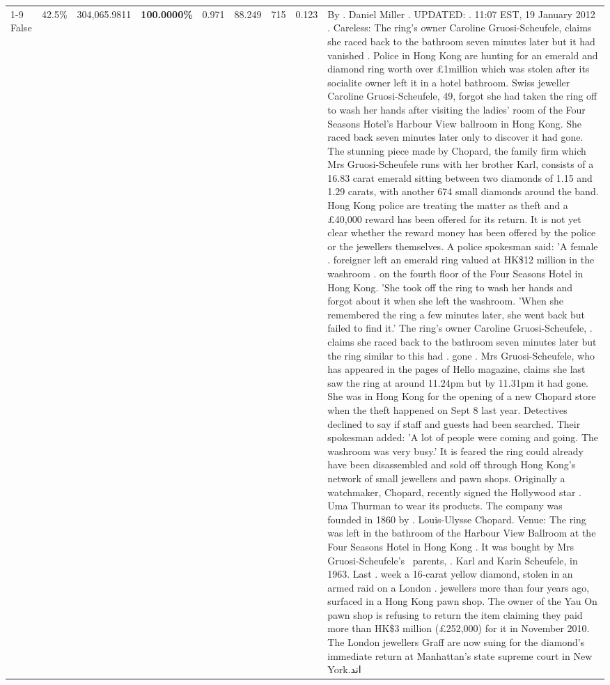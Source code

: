 \begin{table}[H]
\begin{tabular}{lllrlllll}
\cline{1-9} \cline{2-9}
False & 42.5\% & \color{red} 304,065.9811 & \bfseries \color{red} 100.0000\% & 0.971 & 88.249 & 715 & 0.123 & By . Daniel Miller . UPDATED: . 11:07 EST, 19 January 2012 . Careless: The ring's owner Caroline Gruosi-Scheufele, claims she raced back to the bathroom seven minutes later but it had vanished . Police in Hong Kong are hunting for an emerald and diamond ring worth over £1million which was stolen after its socialite owner left it in a hotel bathroom. Swiss jeweller Caroline Gruosi-Scheufele, 49, forgot she had taken the ring off to wash her hands after visiting the ladies' room of the Four Seasons Hotel's Harbour View ballroom in Hong Kong. She raced back seven minutes later only to discover it had gone. The stunning piece made by Chopard, the family firm which Mrs Gruosi-Scheufele runs with her brother Karl, consists of a 16.83 carat emerald sitting between two diamonds of 1.15 and 1.29 carats, with another 674 small diamonds around the band. Hong Kong police are treating the matter as theft and a £40,000 reward has been offered for its return. It is not yet clear whether the reward money has been offered by the police or the jewellers themselves. A police spokesman said: 'A female . foreigner left an emerald ring valued at HK\$12 million in the washroom . on the fourth floor of the Four Seasons Hotel in Hong Kong. 'She took off the ring to wash her hands and forgot about it when she left the washroom. 'When she remembered the ring a few minutes later, she went back but failed to find it.' The ring's owner Caroline Gruosi-Scheufele, . claims she raced back to the bathroom seven minutes later but the ring similar to this had . gone . Mrs Gruosi-Scheufele, who has appeared in the pages of Hello magazine, claims she last saw the ring at around 11.24pm but by 11.31pm it had gone. She was in Hong Kong for the opening of a new Chopard store when the theft happened on Sept 8 last year. Detectives declined to say if staff and guests had been searched. Their spokesman added: 'A lot of people were coming and going. The washroom was very busy.' It is feared the ring could already have been disassembled and sold off through Hong Kong's network of small jewellers and pawn shops. Originally a watchmaker, Chopard, recently signed the Hollywood star . Uma Thurman to wear its products. The company was founded in 1860 by . Louis-Ulysse Chopard. Venue: The ring was left in the bathroom of the Harbour View Ballroom at the Four Seasons Hotel in Hong Kong . It was bought by Mrs Gruosi-Scheufele's  parents, . Karl and Karin Scheufele, in 1963. Last . week a 16-carat yellow diamond, stolen in an armed raid on a London . jewellers more than four years ago, surfaced in a Hong Kong pawn shop. The owner of the Yau On pawn shop is refusing to return the item claiming they paid more than HK\$3 million (£252,000) for it in November 2010. The London jewellers Graff are now suing for the diamond’s immediate return at Manhattan’s state supreme court in New York.اند \\

\end{tabular}
\end{table}
